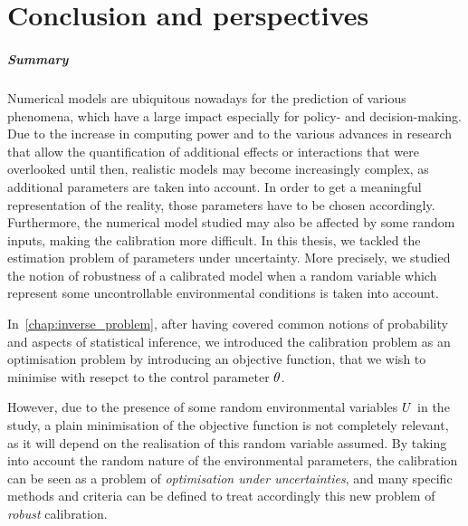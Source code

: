 \documentclass[../../Main_ManuscritThese.tex]{subfiles}
\begin{document}
\pagestyle{conclusionStyle}



\TitleBtwLines
\chapter*{Conclusion and perspectives}
{}
\label{chap:Conclusion}
\renewcommand{\thesection}{} %

\paragraph{Summary}

Numerical models are ubiquitous nowadays for the prediction of various
phenomena, which have a large impact especially for policy- and
decision-making.  Due to the increase in computing power and to the
various advances in research that allow the quantification of
additional effects or interactions that were overlooked until then,
realistic models may become increasingly complex, as additional
parameters are taken into account. In order to get a meaningful
representation of the reality, those parameters have to be chosen
accordingly. Furthermore, the numerical model studied may also be
affected by some random inputs, making the calibration more
difficult. In this thesis, we tackled the estimation problem of
parameters under uncertainty. More precisely, we studied the notion of
robustness of a calibrated model when a random variable which
represent some uncontrollable environmental conditions is taken into
account.


In~\cref{chap:inverse_problem}, after having covered common notions
of probability and aspects of statistical inference, we introduced
the calibration problem as an optimisation problem by introducing an
objective function, that we wish to minimise with resepct to the
control parameter $\theta$.

However, due to the presence of some random environmental variables
$U$ in the study, a plain minimisation of the objective function is
not completely relevant, as it will depend on the realisation of this
random variable assumed.  By
taking into account the random nature of the {environmental
  parameters}, the calibration can be seen as a problem of
\emph{optimisation under uncertainties}, and many specific methods and
criteria can be defined to treat accordingly this new problem of
\emph{robust} calibration.
\end{document}
